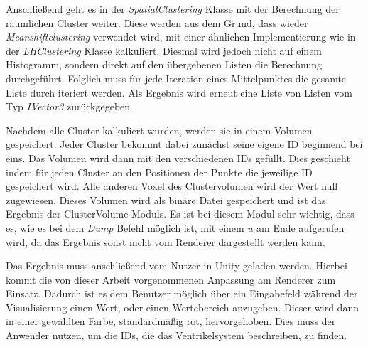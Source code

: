 Anschließend geht es in der \textit{SpatialClustering} Klasse mit der Berechnung der räumlichen Cluster weiter. Diese werden aus dem Grund, dass wieder \textit{Meanshiftclustering} verwendet wird, mit einer ähnlichen Implementierung wie in der \textit{LHClustering} Klasse kalkuliert. Diesmal wird jedoch nicht auf einem Histogramm, sondern direkt auf den übergebenen Listen die Berechnung durchgeführt. Folglich muss für jede Iteration eines Mittelpunktes die gesamte Liste durch iteriert werden.
\newline
Als Ergebnis wird erneut eine Liste von Listen vom Typ \textit{IVector3} zurückgegeben.


Nachdem alle Cluster kalkuliert wurden, werden sie in einem Volumen gespeichert. Jeder Cluster bekommt dabei zunächst seine eigene ID beginnend bei eins. Das Volumen wird dann mit den verschiedenen IDs gefüllt. Dies geschieht indem für jeden Cluster an den Positionen der Punkte die jeweilige ID gespeichert wird. Alle anderen Voxel des Clustervolumen wird der Wert null zugewiesen. Dieses Volumen wird als binäre Datei gespeichert und ist das Ergebnis der ClusterVolume Moduls. Es ist bei diesem Modul sehr wichtig, dass es, wie es bei dem \textit{Dump} Befehl möglich ist, mit einem $u$ am Ende aufgerufen wird, da das Ergebnis sonst nicht vom Renderer dargestellt werden kann.


Das Ergebnis muss anschließend vom Nutzer in Unity geladen werden.
\newline
Hierbei kommt die von dieser Arbeit vorgenommenen Anpassung am Renderer zum Einsatz. Dadurch ist es dem Benutzer möglich über ein Eingabefeld während der Visualisierung einen Wert, oder einen Wertebereich anzugeben. Dieser wird dann in einer gewählten Farbe, standardmäßig rot, hervorgehoben. Dies muss der Anwender nutzen, um die IDs, die das Ventrikelsystem beschreiben, zu finden.



